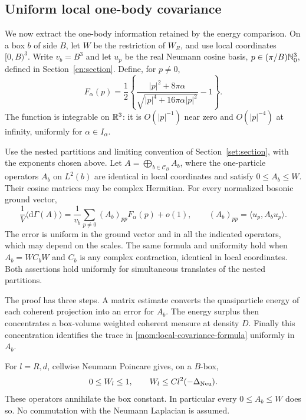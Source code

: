 \subsection{Uniform local one-body covariance}

We now extract the one-body information retained by the energy comparison.
On a box $b$ of side $B$, let $W$ be the restriction of $W_R$, and use
local coordinates $[0,B)^3$.  Write $v_b=B^3$ and let $u_p$ be the real
Neumann cosine basis, $p\in(\pi/B)\mathbb N_0^3$, defined in
Section~\ref{en:section}.  Define, for $p\ne0$,
\begin{equation}\label{en:limiting-V}
 F_\alpha(p)=\frac12\left\{
       \frac{|p|^2+8\pi\alpha}{\sqrt{|p|^4+16\pi\alpha|p|^2}}-1\right\}.
\end{equation}
The function is integrable on $\mathbb R^3$: it is $O(|p|^{-1})$ near zero
and $O(|p|^{-4})$ at infinity, uniformly for $\alpha\in I_\alpha$.

\begin{proposition}\label{mom:local-covariance}
Use the nested partitions and limiting convention of
Section~\ref{set:section}, with the exponents chosen above.
Let $A=\bigoplus_{b\in\mathcal C_B}A_b$, where the one-particle
operators $A_b$ on $L^2(b)$ are identical in local coordinates and
satisfy $0\le A_b\le W$.  Their cosine matrices may be complex Hermitian.
For every normalized bosonic ground vector,
\begin{equation}\label{mom:local-covariance-formula}
 \frac1V\langle\mathrm d\Gamma(A)\rangle
       =\frac1{v_b}\sum_{p\ne0}(A_b)_{pp}F_\alpha(p)+o(1),
 \qquad (A_b)_{pp}=\langle u_p,A_bu_p\rangle.
\end{equation}
The error is uniform in the ground vector and in all the indicated
operators, which may depend on the scales.  The same formula and
uniformity hold when $A_b=WC_bW$ and $C_b$ is any complex contraction,
identical in local coordinates.  Both assertions hold uniformly for
simultaneous translates of the nested partitions.
\end{proposition}

The proof has three steps.  A matrix estimate converts the quasiparticle
energy of each coherent projection into an error for $A_b$.  The energy
surplus then concentrates a box-volume weighted coherent measure at
density $D$.  Finally this concentration identifies the trace in
\eqref{mom:local-covariance-formula} uniformly in $A_b$.

For $l=R,d$, cellwise Neumann Poincare gives, on a $B$-box,
\begin{equation}\label{en:weight-bounds}
 0\le W_l\le1,\qquad W_l\le Cl^2(-\Delta_{\rm Neu}).
\end{equation}
These operators annihilate the box constant.  In particular every
$0\le A_b\le W$ does so.  No commutation with the Neumann Laplacian
is assumed.

